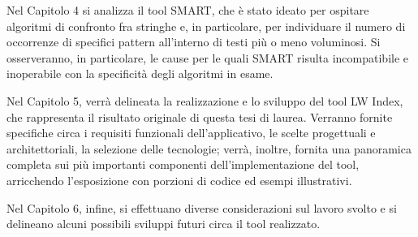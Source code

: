 Nel Capitolo 4 si analizza il tool SMART, che è stato ideato per ospitare algoritmi di confronto fra stringhe e, in particolare, per individuare il numero di occorrenze di specifici pattern all'interno di testi più o meno voluminosi. Si osserveranno, in particolare, le cause per le quali SMART risulta incompatibile e inoperabile con la specificità degli algoritmi in esame.

Nel Capitolo 5, verrà delineata la realizzazione e lo sviluppo del tool LW Index, che rappresenta il risultato originale di questa tesi di laurea. Verranno fornite specifiche circa i requisiti funzionali dell'applicativo, le scelte progettuali e architettoriali, la selezione delle tecnologie; verrà, inoltre, fornita una panoramica completa sui più importanti componenti dell'implementazione del tool, arricchendo l'esposizione con porzioni di codice ed esempi illustrativi.

Nel Capitolo 6, infine, si effettuano diverse considerazioni sul lavoro svolto e si delineano alcuni possibili sviluppi futuri circa il tool realizzato.